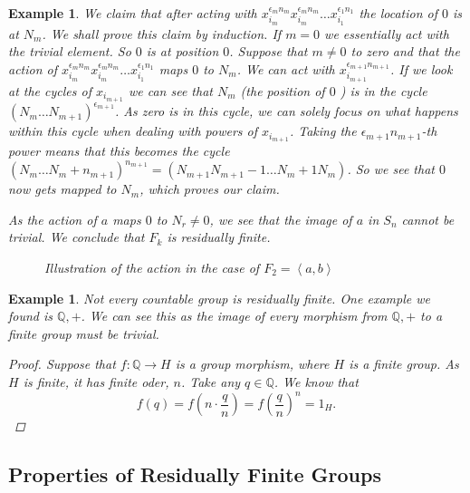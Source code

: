 \documentclass[titlepage, a4paper]{article}
\newcommand{\Q}{\mathbb{Q}}
\theoremstyle{theoremdd}
\theoremstyle{definitiondd}
\theoremstyle{remarkdd}
\newtheorem{example}[theorem]{Example}
\begin{document}
\begin{example}
We claim that after acting with $x_{i_{m}}^{\epsilon_{m}n_{m}}x_{i_{m}}^{\epsilon_{m}n_{m}} \ldots x_{i_1}^{\epsilon_1n_1}$ the location of  $0$ is at $N_m$.
We shall prove this claim by induction.
If  $m=0$ we essentially act with the trivial element. So $0$ is at position $0$.
 Suppose that $m \ne 0$ to zero and that the action of $x_{i_{m}}^{\epsilon_{m}n_{m}}x_{i_{m}}^{\epsilon_{m}n_{m}} \ldots x_{i_1}^{\epsilon_1n_1}$ maps $0$ to $N_m$. 
 We can act with  $x_{i_{m+1}}^{\epsilon_{m+1}n_{m+1}}$. 
 If we look at the cycles of $x_{i_{m+1}}$ we can see that $N_m$ (the position of  $0$ ) is in the cycle $(N_m \ldots N_{m+1})^{\epsilon_{m+1}}$. As zero is in this cycle, we can solely focus on what happens within this cycle when dealing with powers of $x_{i_{m+1}}$. 
 Taking the $\epsilon _{m+1} n_{m+1}$-th power means that this becomes the cycle $(N_m \ldots N_{m} + n_{m+1})^{n_{m+1}} = (N_{m+1} N_{m+1}-1 \ldots N_m + 1 N_m)$. 
So we see that $0$ now gets mapped to $N_m$, which proves our claim.

As the action of  $a$ maps $0$ to $N_r \ne 0$, we see that the image of  $a$ in  $S_n$ cannot be trivial. 
We conclude that $F_k$ is residually finite.

\begin{figure}[ht]
	\centering
	
	\caption{Illustration of the action in the case of $F_2 = \left<a,b \right>$}
	\label{fig:}
\end{figure}

\end{example}

\begin{example}
	Not every countable group is residually finite. One example we found is $\Q, +$.
	We can see this as the image of every morphism from $\Q, +$ to a finite group must be trivial. 
	\begin{proof}
		Suppose that $f:\Q \to H$ is a group morphism, where $H$ is a finite group. 
		As $H$ is finite, it has finite oder, $n$.
		Take any $q \in \Q$. 
		We know that  \[
			f(q) = f\left(n\cdot \frac{q}{n}\right) = f\left(\frac{q}{n}\right)^{n} = 1_H
		.\] 
	\end{proof}
\end{example}



\subsection{Properties of Residually Finite Groups}
\end{document}

